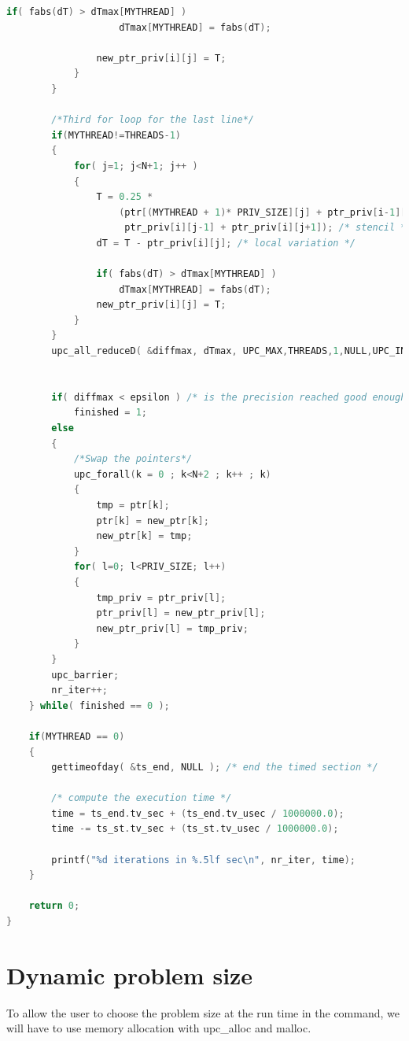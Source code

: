 \documentclass{report}
\begin{document}
\begin{lstlisting}[language=c]
                if( fabs(dT) > dTmax[MYTHREAD] )
                    dTmax[MYTHREAD] = fabs(dT);
    
                new_ptr_priv[i][j] = T;
            }
        }

        /*Third for loop for the last line*/
        if(MYTHREAD!=THREADS-1)
        {
            for( j=1; j<N+1; j++ )
            {
                T = 0.25 *
                    (ptr[(MYTHREAD + 1)* PRIV_SIZE][j] + ptr_priv[i-1][j] +
                     ptr_priv[i][j-1] + ptr_priv[i][j+1]); /* stencil */
                dT = T - ptr_priv[i][j]; /* local variation */

                if( fabs(dT) > dTmax[MYTHREAD] )
                    dTmax[MYTHREAD] = fabs(dT);
                new_ptr_priv[i][j] = T;
            }
        }
        upc_all_reduceD( &diffmax, dTmax, UPC_MAX,THREADS,1,NULL,UPC_IN_ALLSYNC | UPC_OUT_ALLSYNC);

        
        if( diffmax < epsilon ) /* is the precision reached good enough ? */
            finished = 1;
        else
        {
            /*Swap the pointers*/
            upc_forall(k = 0 ; k<N+2 ; k++ ; k)   
            {   
                tmp = ptr[k];
                ptr[k] = new_ptr[k];
                new_ptr[k] = tmp;  
            }
            for( l=0; l<PRIV_SIZE; l++)
            {
                tmp_priv = ptr_priv[l];
                ptr_priv[l] = new_ptr_priv[l];
                new_ptr_priv[l] = tmp_priv;
            }
        }
        upc_barrier;
        nr_iter++;
    } while( finished == 0 );

    if(MYTHREAD == 0)
    {
        gettimeofday( &ts_end, NULL ); /* end the timed section */

        /* compute the execution time */
        time = ts_end.tv_sec + (ts_end.tv_usec / 1000000.0);
        time -= ts_st.tv_sec + (ts_st.tv_usec / 1000000.0);

        printf("%d iterations in %.5lf sec\n", nr_iter, time);
    }
    
    return 0;
}
\end{lstlisting}

\section{Dynamic problem size}

To allow the user to choose the problem size at the run time in the command, we will have to use memory allocation with upc\_alloc and malloc.
\end{document}
